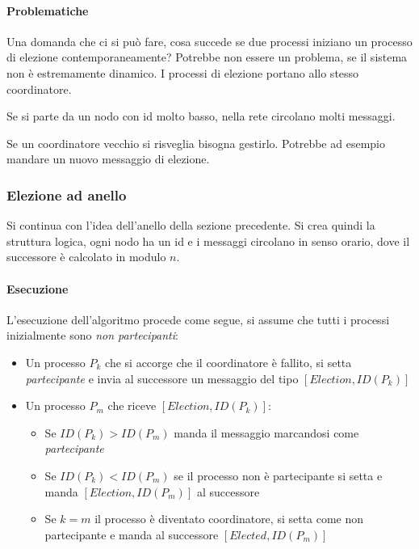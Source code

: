 \paragraph{Problematiche}
Una domanda che ci si può fare, cosa succede se due processi 
iniziano un processo di elezione contemporaneamente?
Potrebbe non essere un problema, se il sistema non è estremamente 
dinamico. I processi di elezione portano allo stesso coordinatore.

Se si parte da un nodo con id molto basso, nella rete circolano 
molti messaggi.

Se un coordinatore vecchio si risveglia bisogna gestirlo. Potrebbe ad 
esempio mandare un nuovo messaggio di elezione.

\subsubsection{Elezione ad anello}

Si continua con l'idea dell'anello della sezione precedente.
Si crea quindi la struttura logica, ogni nodo ha un id e i messaggi 
circolano in senso orario, dove il successore è calcolato in modulo 
$n$.

\paragraph{Esecuzione}
L'esecuzione dell'algoritmo procede come segue, si assume che 
tutti i processi inizialmente sono \emph{non partecipanti}:
\begin{itemize}
    \item Un processo $P_k$ che si accorge che il coordinatore è fallito, 
    si setta \emph{partecipante} e invia al successore un messaggio 
    del tipo $[\mathit{Election}, \mathit{ID}(P_k)]$
    \item Un processo $P_m$ che riceve $[\mathit{Election}, \mathit{ID}(P_k)]$:
    \begin{itemize}
        \item Se $\mathit{ID}(P_k) > \mathit{ID}(P_m)$ manda il messaggio 
        marcandosi come \emph{partecipante}
        \item Se $\mathit{ID}(P_k) < \mathit{ID}(P_m)$ se il processo 
        non è partecipante si setta e manda $[\mathit{Election}, \mathit{ID}(P_m)]$
        al successore
        \item Se $k = m$ il processo è diventato coordinatore, si setta 
        come non partecipante e manda al successore $[\mathit{Elected}, \mathit{ID}(P_m)]$
    \end{itemize}
\end{itemize}

